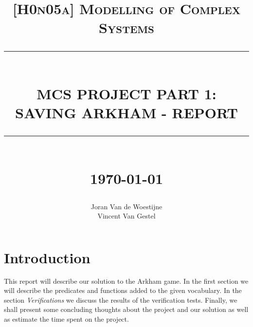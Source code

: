 \documentclass[12pt]{report}
\newcommand{\HRule}[1]{\rule{\linewidth}{#1}}
\begin{document}
\title{ \normalsize \textsc{[H0n05a] Modelling of Complex Systems}
		\\ [2.0cm]
		\HRule{0.5pt} \\
		\LARGE \textbf{\uppercase{MCS Project Part 1: Saving Arkham - Report}}
		\HRule{2pt} \\ [0.5cm]
		\normalsize \today \vspace*{5\baselineskip}}

\date{}

\author{
		Joran Van de Woestijne \\
                Vincent Van Gestel}

\maketitle
\newpage

\sectionfont{\scshape}

\section*{Introduction}
This report will describe our solution to the Arkham game. In the first section we will describe the predicates and functions added to the given vocabulary. In the section \emph{Verifications} we discuss the results of the verification tests. Finally, we shall present some concluding thoughts about the project and our solution as well as estimate the time spent on the project.
\end{document}
